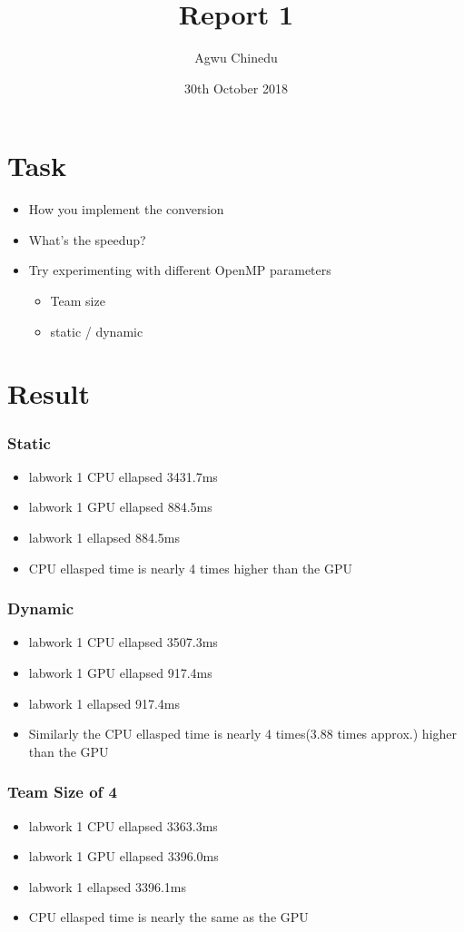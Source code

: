 \documentclass[letterpaper,12pt]{article}
\begin{document}
\title{Report 1}
\author{Agwu Chinedu}
\date{30th October 2018}
\maketitle


\section{Task}
\begin{itemize}
\item How you implement the conversion
\item What’s the speedup?
\item Try experimenting with different OpenMP parameters
	\begin{itemize}
	\item Team size
    \item  static / dynamic
	\end{itemize}
\end{itemize}


\section{Result}
\subsubsection{Static}
\begin{itemize}
\item labwork 1 CPU ellapsed 3431.7ms
\item labwork 1 GPU ellapsed 884.5ms
\item labwork 1 ellapsed 884.5ms
\item CPU ellasped time is nearly 4 times higher than the GPU
\end{itemize}

\subsubsection{Dynamic}

\begin{itemize}
\item labwork 1 CPU ellapsed 3507.3ms
\item labwork 1 GPU ellapsed 917.4ms
\item labwork 1 ellapsed 917.4ms
\item Similarly the CPU ellasped time is nearly 4 times(3.88 times approx.) higher than the GPU
\end{itemize}


\subsubsection{Team Size of 4}
\begin{itemize}
\item labwork 1 CPU ellapsed 3363.3ms
\item labwork 1 GPU ellapsed 3396.0ms
\item labwork 1 ellapsed 3396.1ms
\item CPU ellasped time is nearly the same as the GPU
\end{itemize}
\end{document}
